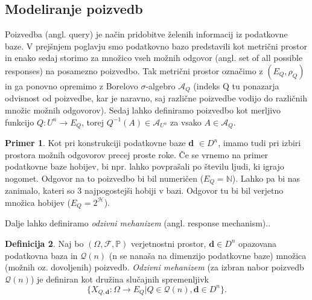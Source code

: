 \documentclass[12pt,a4paper]{amsart}
\theoremstyle{definition} %
\newtheorem{definicija}{Definicija}[section]
\newtheorem{primer}[definicija]{Primer}
\theoremstyle{plain} %
\begin{document}
\subsection{Modeliranje poizvedb}
Poizvedba (angl. query) je način pridobitve želenih informacij iz podatkovne baze. V prejšnjem poglavju smo podatkovno bazo predstavili kot metrični prostor in enako sedaj storimo za množico vseh možnih odgovor (angl. set of all possible responses) na posamezno poizvedbo. Tak metrični prostor označimo z $(E_{Q}, \rho_{Q})$ in ga ponovno opremimo z Borelovo $\sigma$-algebro $\mathcal{A}_{Q}$ (indeks Q tu ponazarja odvisnost od poizvedbe, kar je naravno, saj različne poizvedbe vodijo do različnih množic možnih odgovorov). Sedaj lahko definiramo poizvedbo kot merljivo funkcijo $Q: U^n \rightarrow E_{Q} $, torej $Q^{-1}(A) \in \mathcal{A}_{U^n}$ za vsako $A \in \mathcal{A}_Q$.
\begin{primer} Kot pri konstrukciji podatkovne baze \textbf{d} $\in D^n$, imamo tudi pri izbiri prostora možnih odgovorov precej proste roke. Če se vrnemo na primer podatkovne baze hobijev, bi npr. lahko povprašali po številu ljudi, ki igrajo nogomet. Odgovor na to poizvedbo bi bil numeričen ($E_{Q} = \mathbb{N}$). Lahko pa bi nas zanimalo, kateri so 3 najpogostejši hobiji v bazi. Odgovor tu bi bil verjetno množica hobijev  ($E_{Q} = 2^\mathcal{H}$).
\end{primer}
\newline
\newline
Dalje lahko definiramo \textit{odzivni mehanizem} (angl. response mechanism).. 
\begin{definicija}
Naj bo $(\Omega , \mathcal{F}, \mathbb {P} )$ verjetnostni prostor, $\textbf{d}\in D^n$ opazovana podatkovna baza in $\mathcal{Q}(n)$ (n se nanaša na dimenzijo podatkovne baze) množica (možnih oz. dovoljenih) poizvedb. \textit{Odzivni mehanizem} (za izbran nabor poizvedb $\mathcal{Q}(n)$) je definiran kot družina slučajnih spremenljivk
\begin{equation}\label{odzivni}
 \{X_{Q,\textbf{d}} : \Omega \rightarrow  E_{Q} | Q \in  \mathcal{Q} (n), \textbf{d} \in D^n\} \tag{1}.
\end{equation} 
\end{definicija}
\end{document}
